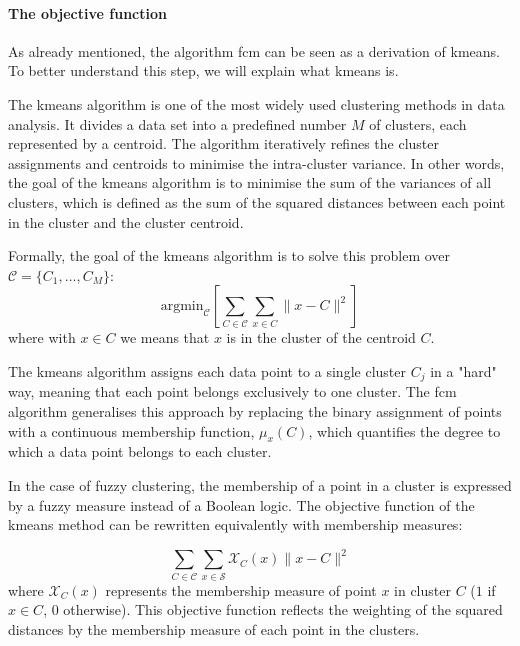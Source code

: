 \paragraph{The objective function}
\begin{toReview}
	As already mentioned, the algorithm \gls{fcm} can be seen as a derivation of \gls{kmeans}. To better understand this step, we will explain what \gls{kmeans} is.

	\noindent The \gls{kmeans} algorithm is one of the most widely used clustering methods in data analysis. It divides a data set into a predefined number $M$ of clusters, each represented by a centroid. The algorithm iteratively refines the cluster assignments and centroids to minimise the intra-cluster variance. In other words, the goal of the \gls{kmeans} algorithm is to minimise the sum of the variances of all clusters, which is defined as the sum of the squared distances between each point in the cluster and the cluster centroid.

	\noindent Formally, the goal of the \gls{kmeans} algorithm is to solve this problem over \\ $\mathcal{C} = \{C_1,\ldots,C_M\}$:
	\begin{equation*}
		\text{argmin}_\mathcal{C}\left[\sum_{C\in\mathcal{C}}\sum_{x \in C}\|x-C\|^2\right]
	\end{equation*}
	where with $x\in C$ we means that $x$ is in the cluster of the centroid $C$.

	\noindent The \gls{kmeans} algorithm assigns each data point to a single cluster $C_j$ in a "hard" way, meaning that each point belongs exclusively to one cluster. The \gls{fcm} algorithm generalises this approach by replacing the binary assignment of points with a continuous membership function, $\mu_x(C)$, which quantifies the degree to which a data point belongs to each cluster.
\end{toReview}

	\noindent In the case of fuzzy clustering, the membership of a point in a cluster is expressed by a fuzzy measure instead of a Boolean logic. The objective function of the \gls{kmeans} method can be rewritten equivalently with membership measures:
	\begin{modified}
	\begin{equation*}
		\sum_{C\in\mathcal{C}}\sum_{x \in \mathcal{S}}\mathcal{X}_C(x)\|x-C\|^2
	\end{equation*}
	where $\mathcal{X}_C(x)$ represents the membership measure of point $x$ in cluster $C$ ($1$ if $x\in C$, $0$ otherwise). This objective function reflects the weighting of the squared distances by the membership measure of each point in the clusters.
	\end{modified}


